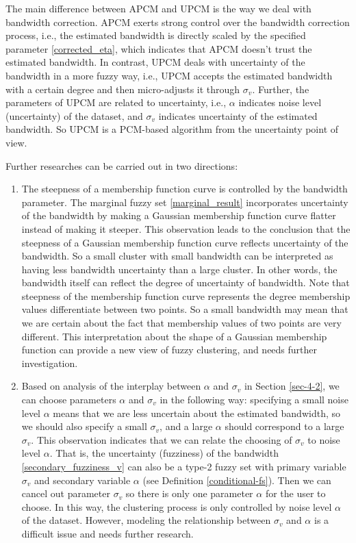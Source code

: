 \documentclass[journal,transmag]{IEEEtran}
\theoremstyle{definition}
\begin{document}
The main difference between APCM and UPCM is the way we deal with bandwidth correction.
APCM exerts strong control over the bandwidth correction process, i.e., the estimated bandwidth is directly scaled by the specified parameter \eqref{corrected_eta}, which indicates that APCM doesn't trust the estimated bandwidth. In contrast, UPCM deals with uncertainty of the bandwidth in a more fuzzy way, i.e., UPCM accepts the estimated bandwidth with a certain degree and then micro-adjusts it through $\sigma_v$. Further, the parameters of UPCM are related to uncertainty, i.e., $\alpha$ indicates noise level (uncertainty) of the dataset, and $\sigma_v$ indicates uncertainty of the estimated bandwidth. So UPCM is a PCM-based algorithm from the uncertainty point of view.

Further researches can be carried out in two directions:
\begin{enumerate}
\item The steepness of a membership function curve is controlled by the bandwidth parameter. The marginal fuzzy set \eqref{marginal_result} incorporates uncertainty of the bandwidth by making a Gaussian membership function curve flatter instead of making it steeper.
This observation leads to the conclusion that the steepness of a Gaussian membership function curve reflects uncertainty of the bandwidth. So a small cluster with small bandwidth can be interpreted as having less bandwidth uncertainty than a large cluster. In other words, the bandwidth itself can reflect the degree of uncertainty of bandwidth. Note that steepness of the membership function curve represents the degree membership values differentiate between two points. So a small bandwidth may mean that we are certain about the fact that membership values of two points are very different. This interpretation about the shape of a Gaussian  membership function can provide a new view of fuzzy clustering, and needs further investigation.
\item Based on analysis of the interplay between $\alpha$ and $\sigma_v$ in Section \ref{sec-4-2}, we can choose parameters $\alpha$ and $\sigma_v$ in the following way: specifying a small noise level $\alpha$ means that we are less uncertain about the estimated bandwidth, so we should also specify a small $\sigma_v$, and a large $\alpha$ should correspond to a large $\sigma_v$. This observation indicates that we can relate the choosing of $\sigma_v$ to noise level $\alpha$. That is, the uncertainty (fuzziness) of the bandwidth \eqref{secondary_fuzziness_v} can also be a type-2 fuzzy set with primary variable $\sigma_v$ and secondary variable $\alpha$ (see Definition \ref{conditional-fs}). Then we can cancel out  parameter $\sigma_v$ so there is only one parameter $\alpha$ for the user to choose. In this way, the clustering process is only controlled by noise level $\alpha$ of the dataset. However, modeling the relationship between $\sigma_v$ and $\alpha$ is a difficult issue and needs further research.
\end{enumerate}


\end{document}
